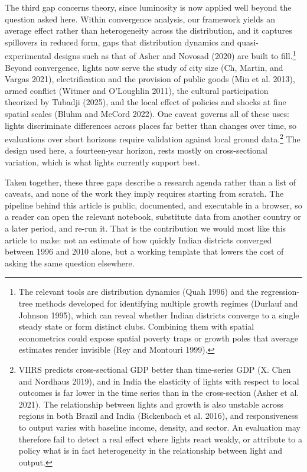 \documentclass[
  letterpaper,
  DIV=11,
  numbers=noendperiod]{scrartcl}
\begin{document}
The third gap concerns theory, since luminosity is now applied well
beyond the question asked here. Within convergence analysis, our
framework yields an average effect rather than heterogeneity across the
distribution, and it captures spillovers in reduced form, gaps that
distribution dynamics and quasi-experimental designs such as that of
Asher and Novosad (2020) are built to fill.\footnote{The relevant tools
  are distribution dynamics (Quah 1996) and the regression-tree methods
  developed for identifying multiple growth regimes (Durlauf and Johnson
  1995), which can reveal whether Indian districts converge to a single
  steady state or form distinct clubs. Combining them with spatial
  econometrics could expose spatial poverty traps or growth poles that
  average estimates render invisible (Rey and Montouri 1999).} Beyond
convergence, lights now serve the study of city size (Ch, Martin, and
Vargas 2021), electrification and the provision of public goods (Min et
al. 2013), armed conflict (Witmer and O'Loughlin 2011), the cultural
participation theorized by Tubadji (2025), and the local effect of
policies and shocks at fine spatial scales (Bluhm and McCord 2022). One
caveat governs all of these uses: lights discriminate differences across
places far better than changes over time, so evaluations over short
horizons require validation against local ground data.\footnote{VIIRS
  predicts cross-sectional GDP better than time-series GDP (X. Chen and
  Nordhaus 2019), and in India the elasticity of lights with respect to
  local outcomes is far lower in the time series than in the
  cross-section (Asher et al. 2021). The relationship between lights and
  growth is also unstable across regions in both Brazil and India
  (Bickenbach et al. 2016), and responsiveness to output varies with
  baseline income, density, and sector. An evaluation may therefore fail
  to detect a real effect where lights react weakly, or attribute to a
  policy what is in fact heterogeneity in the relationship between light
  and output.} The design used here, a fourteen-year horizon, rests
mostly on cross-sectional variation, which is what lights currently
support best.

Taken together, these three gaps describe a research agenda rather than
a list of caveats, and none of the work they imply requires starting
from scratch. The pipeline behind this article is public, documented,
and executable in a browser, so a reader can open the relevant notebook,
substitute data from another country or a later period, and re-run it.
That is the contribution we would most like this article to make: not an
estimate of how quickly Indian districts converged between 1996 and 2010
alone, but a working template that lowers the cost of asking the same
question elsewhere.
\end{document}
